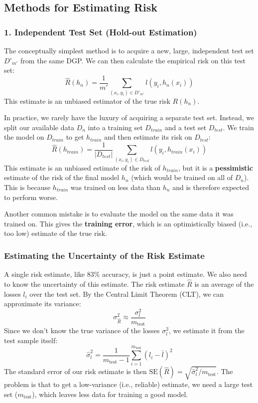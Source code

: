 \documentclass{article}
\begin{document}
\begin{multicols}{2}
	\subsection{Methods for Estimating Risk}

	\subsubsection{1. Independent Test Set (Hold-out Estimation)}
	The conceptually simplest method is to acquire a new, large, independent test set $D'_{m'}$ from the same DGP. We can then calculate the empirical risk on this test set:
	$$ \hat{R}(h_n) = \frac{1}{m'} \sum_{(x_i, y_i) \in D'_{m'}} l(y_i, h_n(x_i)) $$
	This estimate is an unbiased estimator of the true risk $R(h_n)$.

	In practice, we rarely have the luxury of acquiring a separate test set. Instead, we split our available data $D_n$ into a training set $D_{train}$ and a test set $D_{test}$. We train the model on $D_{train}$ to get $h_{train}$ and then estimate its risk on $D_{test}$:
	$$ \hat{R}(h_{train}) = \frac{1}{|D_{test}|} \sum_{(x_i, y_i) \in D_{test}} l(y_i, h_{train}(x_i)) $$
	This estimate is an unbiased estimate of the risk of $h_{train}$, but it is a \textbf{pessimistic} estimate of the risk of the final model $h_n$ (which would be trained on all of $D_n$). This is because $h_{train}$ was trained on less data than $h_n$ and is therefore expected to perform worse.

	Another common mistake is to evaluate the model on the same data it was trained on. This gives the \textbf{training error}, which is an optimistically biased (i.e., too low) estimate of the true risk.

	\subsubsection{Estimating the Uncertainty of the Risk Estimate}
	A single risk estimate, like 83\% accuracy, is just a point estimate. We also need to know the uncertainty of this estimate. The risk estimate $\hat{R}$ is an average of the losses $l_i$ over the test set. By the Central Limit Theorem (CLT), we can approximate its variance:
	$$ \sigma^2_{\hat{R}} \approx \frac{\sigma^2_l}{m_{\text{test}}} $$
	Since we don't know the true variance of the losses $\sigma^2_l$, we estimate it from the test sample itself:
	$$ \hat{\sigma}^2_l = \frac{1}{m_{\text{test}}-1} \sum_{i=1}^{m_{\text{test}}} (l_i - \bar{l})^2 $$
	The standard error of our risk estimate is then $\text{SE}(\hat{R}) = \sqrt{\hat{\sigma}^2_l / m_{\text{test}}}$. The problem is that to get a low-variance (i.e., reliable) estimate, we need a large test set ($m_{\text{test}}$), which leaves less data for training a good model.


\end{multicols}
\end{document}
